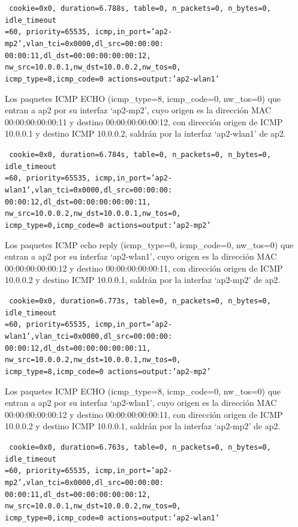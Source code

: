 \documentclass[a4paper,12pt,twoside,spanish]{book}
\begin{document}
\noindent\texttt{
	cookie=0x0, duration=6.788s, table=0, n\_packets=0, n\_bytes=0, idle\_timeout\\
	=60, priority=65535,
	icmp,in\_port='ap2-mp2',vlan\_tci=0x0000,dl\_src=00:00:00:\\
	00:00:11,dl\_dst=00:00:00:00:00:12,
	nw\_src=10.0.0.1,nw\_dst=10.0.0.2,nw\_tos=0,\\
	icmp\_type=8,icmp\_code=0 actions=output:'ap2-wlan1'
}

Los paquetes ICMP ECHO (icmp\_type=8, icmp\_code=0, nw\_tos=0) que entran a ap2 por su interfaz ‘ap2-mp2’, cuyo origen es la dirección MAC 00:00:00:00:00:11 y destino 00:00:00:00:00:12, con dirección origen de ICMP 10.0.0.1 y destino ICMP 10.0.0.2, saldrán por la interfaz ‘ap2-wlan1’ de ap2.\par 

\noindent\texttt{
	cookie=0x0, duration=6.784s, table=0, n\_packets=0, n\_bytes=0, idle\_timeout\\
	=60, priority=65535,
	icmp,in\_port='ap2-wlan1',vlan\_tci=0x0000,dl\_src=00:00:00:\\
	00:00:12,dl\_dst=00:00:00:00:00:11,
	nw\_src=10.0.0.2,nw\_dst=10.0.0.1,nw\_tos=0,\\
	icmp\_type=0,icmp\_code=0 actions=output:'ap2-mp2'
}

Los paquetes ICMP echo reply (icmp\_type=0, icmp\_code=0, nw\_tos=0) que entran a ap2 por su interfaz ‘ap2-wlan1’, cuyo origen es la dirección MAC 00:00:00:00:00:12 y destino 00:00:00:00:00:11, con dirección origen de ICMP 10.0.0.2 y destino ICMP 10.0.0.1, saldrán por la interfaz ‘ap2-mp2’ de ap2.\par 

\noindent\texttt{
	cookie=0x0, duration=6.773s, table=0, n\_packets=0, n\_bytes=0, idle\_timeout\\
	=60, priority=65535,
	icmp,in\_port='ap2-wlan1',vlan\_tci=0x0000,dl\_src=00:00:00:\\
	00:00:12,dl\_dst=00:00:00:00:00:11,
	nw\_src=10.0.0.2,nw\_dst=10.0.0.1,nw\_tos=0,\\
	icmp\_type=8,icmp\_code=0 actions=output:'ap2-mp2'
}

Los paquetes ICMP ECHO (icmp\_type=8, icmp\_code=0, nw\_tos=0) que entran a ap2 por su interfaz ‘ap2-wlan1’, cuyo origen es la dirección MAC 00:00:00:00:00:12 y destino 00:00:00:00:00:11, con dirección origen de ICMP 10.0.0.2 y destino ICMP 10.0.0.1, saldrán por la interfaz ‘ap2-mp2’ de ap2.\par 

\noindent\texttt{
	cookie=0x0, duration=6.763s, table=0, n\_packets=0, n\_bytes=0, idle\_timeout\\
	=60, priority=65535,
	icmp,in\_port='ap2-mp2',vlan\_tci=0x0000,dl\_src=00:00:00:\\
	00:00:11,dl\_dst=00:00:00:00:00:12,
	nw\_src=10.0.0.1,nw\_dst=10.0.0.2,nw\_tos=0,\\
	icmp\_type=0,icmp\_code=0 actions=output:'ap2-wlan1'
}
\end{document}
